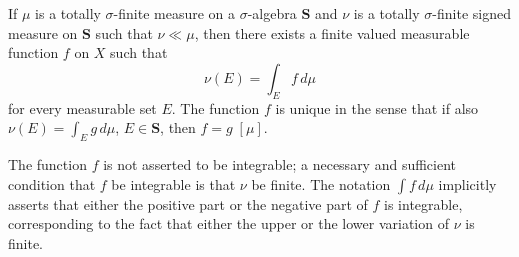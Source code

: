If $\mu$ is a totally $\sigma$-finite measure on a $\sigma$-algebra $\mathbf{S}$ and $\nu$ is a totally $\sigma$-finite signed measure on $\mathbf{S}$ such that $\nu \ll \mu$, then there exists a finite valued measurable function $f$ on $X$ such that
$$\nu(E) = \int_E f \, d\mu$$
for every measurable set $E$. The function $f$ is unique in the sense that if also $\nu(E) = \int_E g \, d\mu$, $E \in \mathbf{S}$, then $f = g \; [\mu]$.

The function $f$ is not asserted to be integrable; a necessary and sufficient condition that $f$ be integrable is that $\nu$ be finite. The notation $\int f \, d\mu$ implicitly asserts that either the positive part or the negative part of $f$ is integrable, corresponding to the fact that either the upper or the lower variation of $\nu$ is finite.
